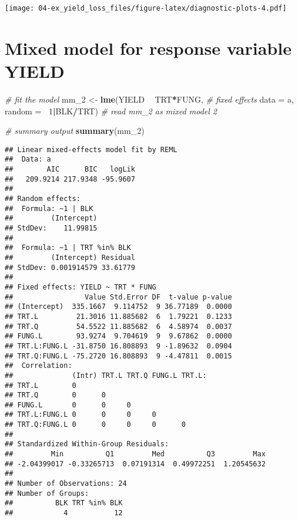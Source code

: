 \documentclass[]{book}
\newenvironment{Shaded}{\begin{snugshade}}{\end{snugshade}}
\newcommand{\CommentTok}[1]{\textcolor[rgb]{0.56,0.35,0.01}{\textit{#1}}}
\newcommand{\DataTypeTok}[1]{\textcolor[rgb]{0.13,0.29,0.53}{#1}}
\newcommand{\DecValTok}[1]{\textcolor[rgb]{0.00,0.00,0.81}{#1}}
\newcommand{\KeywordTok}[1]{\textcolor[rgb]{0.13,0.29,0.53}{\textbf{#1}}}
\newcommand{\NormalTok}[1]{#1}
\newcommand{\OperatorTok}[1]{\textcolor[rgb]{0.81,0.36,0.00}{\textbf{#1}}}
\newcommand{\StringTok}[1]{\textcolor[rgb]{0.31,0.60,0.02}{#1}}
\begin{document}
\texttt{[image: 04-ex\_yield\_loss\_files/figure-latex/diagnostic-plots-4.pdf]}

\hypertarget{mixed-model-for-response-variable-yield}{%
\section{Mixed model for response variable YIELD}\label{mixed-model-for-response-variable-yield}}

\begin{Shaded}
\begin{Highlighting}[]
\CommentTok{# fit the model  }
\NormalTok{mm_}\DecValTok{2}\NormalTok{ <-}\StringTok{ }\KeywordTok{lme}\NormalTok{(YIELD }\OperatorTok{~}\StringTok{ }\NormalTok{TRT}\OperatorTok{*}\NormalTok{FUNG, }\CommentTok{# fixed effects}
            \DataTypeTok{data =}\NormalTok{ a,}
            \DataTypeTok{random =} \OperatorTok{~}\DecValTok{1}\OperatorTok{|}\NormalTok{BLK}\OperatorTok{/}\NormalTok{TRT) }\CommentTok{# read mm_2 as mixed model 2}

\CommentTok{# summary output}
\KeywordTok{summary}\NormalTok{(mm_}\DecValTok{2}\NormalTok{)}
\end{Highlighting}
\end{Shaded}

\begin{verbatim}
## Linear mixed-effects model fit by REML
##  Data: a 
##        AIC      BIC   logLik
##   209.9214 217.9348 -95.9607
## 
## Random effects:
##  Formula: ~1 | BLK
##         (Intercept)
## StdDev:    11.99815
## 
##  Formula: ~1 | TRT %in% BLK
##         (Intercept) Residual
## StdDev: 0.001914579 33.61779
## 
## Fixed effects: YIELD ~ TRT * FUNG 
##                 Value Std.Error DF  t-value p-value
## (Intercept)  335.1667  9.114752  9 36.77189  0.0000
## TRT.L         21.3016 11.885682  6  1.79221  0.1233
## TRT.Q         54.5522 11.885682  6  4.58974  0.0037
## FUNG.L        93.9274  9.704619  9  9.67862  0.0000
## TRT.L:FUNG.L -31.8750 16.808893  9 -1.89632  0.0904
## TRT.Q:FUNG.L -75.2720 16.808893  9 -4.47811  0.0015
##  Correlation: 
##              (Intr) TRT.L TRT.Q FUNG.L TRT.L:
## TRT.L        0                               
## TRT.Q        0      0                        
## FUNG.L       0      0     0                  
## TRT.L:FUNG.L 0      0     0     0            
## TRT.Q:FUNG.L 0      0     0     0      0     
## 
## Standardized Within-Group Residuals:
##         Min          Q1         Med          Q3         Max 
## -2.04399017 -0.33265713  0.07191314  0.49972251  1.20545632 
## 
## Number of Observations: 24
## Number of Groups: 
##          BLK TRT %in% BLK 
##            4           12
\end{verbatim}
\end{document}
